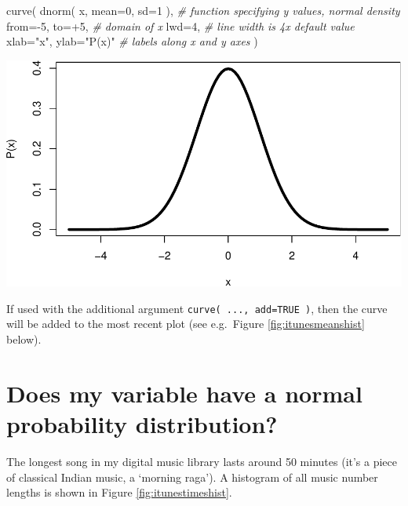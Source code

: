 \documentclass[
]{book}
\newenvironment{Shaded}{\begin{snugshade}}{\end{snugshade}}
\newcommand{\AttributeTok}[1]{\textcolor[rgb]{0.77,0.63,0.00}{#1}}
\newcommand{\CommentTok}[1]{\textcolor[rgb]{0.56,0.35,0.01}{\textit{#1}}}
\newcommand{\DecValTok}[1]{\textcolor[rgb]{0.00,0.00,0.81}{#1}}
\newcommand{\FunctionTok}[1]{\textcolor[rgb]{0.00,0.00,0.00}{#1}}
\newcommand{\NormalTok}[1]{#1}
\newcommand{\SpecialCharTok}[1]{\textcolor[rgb]{0.00,0.00,0.00}{#1}}
\newcommand{\StringTok}[1]{\textcolor[rgb]{0.31,0.60,0.02}{#1}}
\begin{document}
\begin{Shaded}
\begin{Highlighting}[]
\FunctionTok{curve}\NormalTok{( }\FunctionTok{dnorm}\NormalTok{( x, }\AttributeTok{mean=}\DecValTok{0}\NormalTok{, }\AttributeTok{sd=}\DecValTok{1}\NormalTok{ ), }\CommentTok{\# function specifying y values, normal density}
       \AttributeTok{from=}\SpecialCharTok{{-}}\DecValTok{5}\NormalTok{, }\AttributeTok{to=}\SpecialCharTok{+}\DecValTok{5}\NormalTok{, }\CommentTok{\# domain of x}
       \AttributeTok{lwd=}\DecValTok{4}\NormalTok{, }\CommentTok{\# line width is 4x default value}
       \AttributeTok{xlab=}\StringTok{"x"}\NormalTok{, }\AttributeTok{ylab=}\StringTok{"P(x)"} \CommentTok{\# labels along x and y axes}
\NormalTok{       )}
\end{Highlighting}
\end{Shaded}

\includegraphics{QMS-EN_files/figure-latex/curve.dnorm-1.pdf}

If used with the additional argument \texttt{curve(\ ...,\ add=TRUE\ )}, then the curve will be added to the most recent plot (see e.g.~Figure \ref{fig:itunesmeanshist} below).

\hypertarget{sec:isvarnormaldistributed}{%
\section{Does my variable have a normal probability distribution?}\label{sec:isvarnormaldistributed}}

The longest song in my digital music library lasts around 50
minutes (it's a piece of classical Indian music, a `morning raga').
A histogram of all music number lengths is shown in
Figure \ref{fig:itunestimeshist}.
\end{document}
